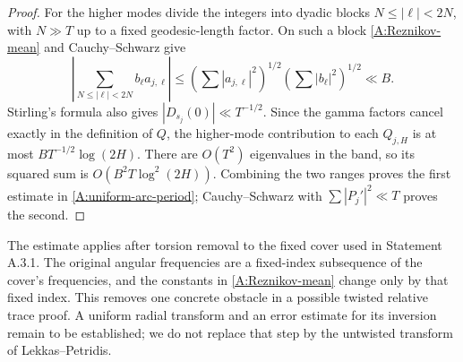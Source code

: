 \begin{proof}
For the higher modes divide the integers into dyadic blocks
$N\leq|\ell|<2N$, with $N\gg T$ up to a fixed geodesic-length factor.
On such a block \eqref{A:Reznikov-mean} and Cauchy--Schwarz give
\[
 \left|\sum_{N\leq|\ell|<2N}b_\ell a_{j,\ell}\right|
 \leq\left(\sum|a_{j,\ell}|^2\right)^{1/2}
       \left(\sum|b_\ell|^2\right)^{1/2}\ll B.
\]
Stirling's formula also gives $|D_{s_j}(0)|\ll T^{-1/2}$.
Since the gamma factors cancel exactly in the definition of $Q$,
the higher-mode contribution to each $Q_{j,H}$ is at most
$BT^{-1/2}\log(2H)$. There are $O(T^2)$ eigenvalues in the band,
so its squared sum is $O(B^2T\log^2(2H))$.
Combining the two ranges proves the first estimate in
\eqref{A:uniform-arc-period}; Cauchy--Schwarz with
$\sum|P_j'|^2\ll T$ proves the second.
\end{proof}

The estimate applies after torsion removal to the fixed cover used in
Statement A.3.1. The original angular frequencies are a fixed-index
subsequence of the cover's frequencies, and the constants in
\eqref{A:Reznikov-mean} change only by that fixed index. This removes
one concrete obstacle in a possible twisted relative trace proof.
A uniform radial transform and an error estimate for its inversion
remain to be established; we do not replace that step by the untwisted
transform of Lekkas--Petridis.
